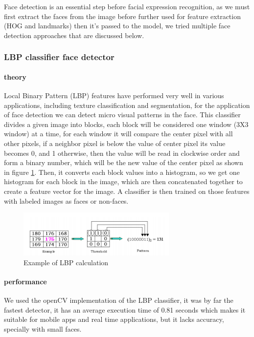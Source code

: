 Face detection is an essential step before facial expression recognition, as we must first extract the faces from the image before further used for feature extraction (HOG and landmarks) then it's passed to the model, we tried multiple face detection approaches that are discussed below.
\subsubsection{LBP classifier face detector}
\paragraph{theory}
Local Binary Pattern (LBP) features have performed very well in various applications, including texture classification and segmentation, for the application of face detection we can detect micro visual patterns in the face.\newline
This classifier divides a given image into blocks, each block will be considered one window (3X3 window) at a time, for each window it will compare the center pixel with all other pixels, if a neighbor pixel is below the value of center pixel its value becomes 0, and 1 otherwise, then the value will be read in clockwise order and form a binary number, which will be the new value of the center pixel as shown in figure \ref{fig:LBP_calculation}.\newline
Then, it converts each block values into a histogram, so we get one histogram for each block in the image, which are then concatenated together to create a feature vector for the image.\newline
A classifier is then trained on those features with labeled images as faces or non-faces.
\begin{figure}
	\centering
	\includegraphics[width=0.7\textwidth]{images/LBP_classifier.png}
	\caption{Example of LBP calculation}
	\label{fig:LBP_calculation}
\end{figure}

\paragraph{performance}
We used the openCV implementation of the LBP classifier, it was by far the fastest detector, it has an average execution time of 0.81 seconds which makes it suitable for mobile apps and real time applications, but it lacks accuracy, specially with small faces.

